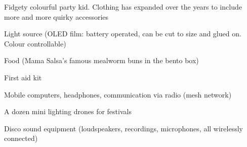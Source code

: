 \begin{npcBox}[title=Disco]
    \begin{consequences}
    \item {}
    \item {}
    \item {}
    \end{consequences}

    \begin{npcDescription}
    Fidgety colourful party kid. Clothing has expanded over the years to include more and more quirky accessories
    \end{npcDescription}


    \begin{equipment}
    \item Light source (OLED film: battery operated, can be cut to size and glued on. Colour controllable)
    \item Food (Mama Salsa's famous mealworm buns in the bento box)
    \item First aid kit
    \item Mobile computers, headphones, communication via radio (mesh network)
    \item A dozen mini lighting drones for festivals
    \item Disco sound equipment (loudspeakers, recordings, microphones, all wirelessly connected)
    \end{equipment}
\end{npcBox}

